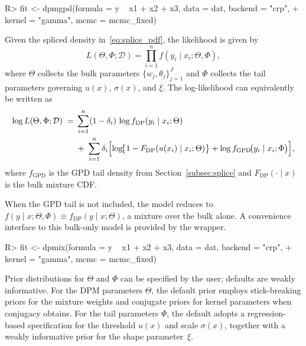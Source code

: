 \documentclass[11pt]{article}\usepackage[]{graphicx}\usepackage[]{xcolor}
\newcommand{\code}[1]{\texttt{\detokenize{#1}}}
\renewenvironment{Schunk}{\vspace{0pt}}{\vspace{-0.1\baselineskip}}
\begin{document}
\begin{Schunk}
\begin{Sinput}
R> fit <- dpmgpd(formula = y ~ x1 + x2 + x3, data = dat, backend = "crp",
+                kernel = "gamma", mcmc = mcmc_fixed)
\end{Sinput}
\end{Schunk}

Given the spliced density in~\eqref{eq:splice_pdf}, the likelihood is given by
\begin{equation}
  L(\Theta,\Phi;\mathcal{D})
  =\prod_{i=1}^n f(y_i\mid x_i;\Theta,\Phi),
  \label{eq:overview-lik}
\end{equation}
where $\Theta$ collects the bulk parameters
$\{w_j,\theta_j\}_{j=1}^J$ and $\Phi$ collects the tail parameters
governing $u(x)$, $\sigma(x)$, and $\xi$.  The log-likelihood can
equivalently be written as
\begin{align*}
  \log L(\Theta,\Phi;\mathcal{D})
  \;=&\;\sum_{i=1}^n (1-\delta_i)\,\log f_{\mathrm{DP}}(y_i\mid x_i;\Theta)
  \\
  &\;+\;\sum_{i=1}^n \delta_i
  \Bigl[
    \log\!\bigl\{1-F_{\mathrm{DP}}(u(x_i)\mid x_i;\Theta)\bigr\}
    +\log f_{\mathrm{GPD}}\!\bigl(y_i\mid x_i;\Phi\bigr)
  \Bigr],
\end{align*}
where $f_{\mathrm{GPD}}$ is the GPD tail density from
Section~\ref{subsec:splice} and $F_{\mathrm{DP}}(\cdot\mid x)$ is the
bulk mixture CDF.

When the GPD tail is not included, the model reduces to
$f(y\mid x;\Theta, \Phi) \equiv f_{\text{DP}}(y \mid x; \Theta)$, a
mixture over the bulk alone.  A convenience interface to this bulk-only
model is provided by the \code{dpmix()} wrapper.

\begin{Schunk}
\begin{Sinput}
R> fit <- dpmix(formula = y ~ x1 + x2 + x3, data = dat, backend = "crp",
+                  kernel = "gamma",  mcmc = mcmc_fixed)
\end{Sinput}
\end{Schunk}

Prior distributions for $\Theta$ and $\Phi$ can be specified by the
user; defaults are weakly informative.  For the DPM parameters
$\Theta$, the default prior employs stick-breaking priors for the
mixture weights and conjugate priors for kernel parameters when
conjugacy obtains.  For the tail parameters $\Phi$, the default adopts
a regression-based specification for the threshold $u(x)$ and scale
$\sigma(x)$, together with a weakly informative prior for the shape
parameter~$\xi$.
\end{document}
